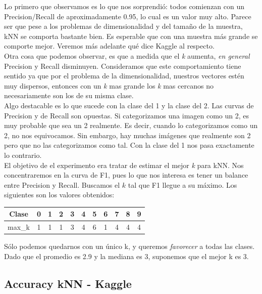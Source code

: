 Lo primero que observamos es lo que nos sorprendió: todos comienzan con un Precision/Recall de aproximadamente 0.95, lo cual es un valor muy alto. Parece ser que pese a los problemas de dimensionalidad y del tamaño de la muestra, kNN se comporta bastante bien. Es esperable que con una muestra más grande se comporte mejor. Veremos más adelante qué dice Kaggle al respecto.\\

Otra cosa que podemos observar, es que a medida que el \textit{k} aumenta, \textit{en general} Precision y Recall disminuyen. Consideramos que este comportamiento tiene sentido ya que por el problema de la dimensionalidad, nuestros vectores estén muy dispersos, entonces con un \textit{k} mas grande los \textit{k} mas cercanos no necesariamente son los de su misma clase. \\

Algo destacable es lo que sucede con la clase del 1 y la clase del 2. Las curvas de Precision y de Recall son opuestas. Si categorizamos una imagen como un 2, es muy probable que sea un 2 realmente. Es decir, cuando lo categorizamos como un 2, no nos equivocamos. Sin embargo, hay muchas imágenes que realmente son 2 pero que no las categorizamos como tal. Con la clase del 1 nos pasa exactamente lo contrario. \\

El objetivo de el experimento era tratar de estimar el mejor \textit{k} para kNN. Nos concentraremos en la curva de F1, pues lo que nos interesa es tener un balance entre Precision y Recall. Buscamos el $k$ tal que F1 llegue a su máximo. Los siguientes son los valores obtenidos: \\

\begin{center}
    \begin{tabular}{| c | c | c | c | c | c | c | c | c | c | c |}
    \hline
    Clase   & 0 & 1 & 2 & 3 & 4 & 5 & 6 & 7 & 8 & 9  \\ \hline
    max_k       & 1 & 1 & 1 & 3 & 4 & 6 & 1 & 4 & 4 & 4  \\ \hline
    \end{tabular}
\end{center}

Sólo podemos quedarnos con un único k, y queremos \textit{favorecer} a todas las clases. Dado que el promedio es 2.9 y la mediana es 3, suponemos que el mejor k es 3.

\subsection{Accuracy kNN - Kaggle}

